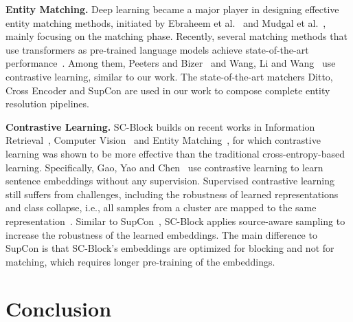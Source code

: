 \documentclass[sigconf,nonacm]{acmart}
\begin{document}
\vspace{.05cm}\noindent\textbf{Entity Matching.}
Deep learning became a major player in designing effective entity matching methods, initiated by Ebraheem et al.~\cite{ebraheem_distributed_2018} 
and Mudgal et al.~\cite{mudgal_deep_2018}, mainly focusing on the matching phase. 
Recently, several matching methods that use transformers as pre-trained language models achieve state-of-the-art performance~\cite{li_deep_2020,brunner_entity_2020, peeters_dual-objective_2021}.
Among them, Peeters and Bizer~\cite{peeters_supervised_2022} and Wang, Li and Wang~\cite{wang_sudowoodo_2022} use contrastive learning, similar to our work. 
The state-of-the-art matchers Ditto, Cross Encoder and SupCon are used in our work to compose complete entity resolution pipelines.

\vspace{.05cm}\noindent\textbf{Contrastive Learning.}
SC-Block builds on recent works in Information Retrieval~\cite{gao_simcse_2021}, Computer Vision~\cite{khosla_supervised_2020} and Entity Matching~\cite{peeters_supervised_2022}, for which contrastive learning was shown to be more effective than the traditional cross-entropy-based learning.  Specifically, Gao, Yao and Chen~\cite{gao_simcse_2021} use contrastive learning to learn sentence embeddings without any supervision. Supervised contrastive learning still suffers from challenges, including the robustness of learned representations~\cite{chuang_debiased_2020} and class collapse, i.e., all samples from a cluster are mapped to the same representation~\cite{chen_perfectly_2022}.
Similar to SupCon~\cite{peeters_supervised_2022}, SC-Block applies source-aware sampling to increase the robustness of the learned embeddings.
The main difference to SupCon is that SC-Block's embeddings are optimized for blocking and not for matching, which requires longer pre-training of the embeddings.





%
 \section{Conclusion}
\label{sec:conclusion}
\end{document}
